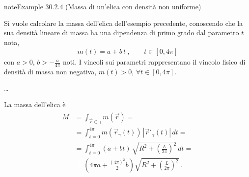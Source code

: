 \documentclass[letterpaper,10pt,italian]{jupyterBook}
\begin{document}
\begin{sphinxadmonition}{note}{Example 30.2.4 (Massa di un’elica con densità non uniforme)}



\sphinxAtStartPar
Si vuole calcolare la massa dell’elica dell’esempio precedente, conoscendo che la sua densità lineare di massa ha una dipendenza di primo grado dal parametro \(t\) nota,
\begin{equation*}
\begin{split}m(t) = a + b \, t \ , \qquad t \in \left[ 0, 4 \pi \right]\end{split}
\end{equation*}
\sphinxAtStartPar
con \(a > 0\), \(b > -\frac{a}{4 \pi}\) noti. I vincoli sui parametri rappresentano il vincolo fisico di densità di massa non negativa, \(m(t) > 0\), \(\forall t \in [0, 4 \pi]\).

\sphinxAtStartPar
…

\sphinxAtStartPar
La massa dell’elica è
\begin{equation*}
\begin{split}\begin{aligned}
  M & = \int_{\vec{r} \in \gamma} m(\vec{r}) = \\
    & = \int_{t = 0}^{4 \pi} m(\vec{r}_{\gamma}(t)) \, |\vec{r}'_{\gamma}(t)| \, dt = \\
    & = \int_{t = 0}^{4 \pi} \left( a + b t \right) \, \sqrt{ R^2 + \left(\frac{L}{2 \pi}\right)^2 } \,  dt =\\
    & = \left( 4 \pi a + \frac{(4 \pi)^2}{2} b \right) \sqrt{ R^2 + \left(\frac{L}{2 \pi}\right)^2 }   \ .
\end{aligned}\end{split}
\end{equation*}\end{sphinxadmonition}
\end{document}
